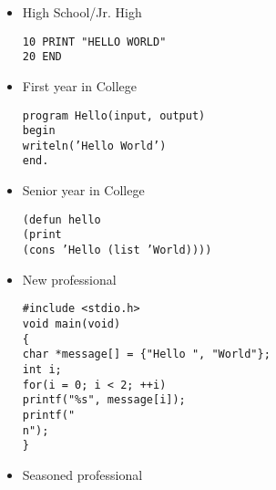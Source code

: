 \begin{itemize}
	\item High School/Jr. High

 \texttt{10 PRINT "HELLO WORLD"\\
20 END}

	\item First year in College

\texttt{program Hello(input, output)\\
begin\\
writeln('Hello World')\\
end.}

	\item Senior year in College
	
\texttt{(defun hello\\
(print\\
(cons 'Hello (list 'World))))}

	\item New professional

\texttt{\#include <stdio.h>\\
void main(void)\\
\{\\
char *message[] = \{"Hello ", "World"\};\\
int i;\\
for(i = 0; i < 2; ++i)\\
printf("\%s", message[i]);\\
printf("\\n");\\
\}}

	\item Seasoned professional
	

\end{itemize}

